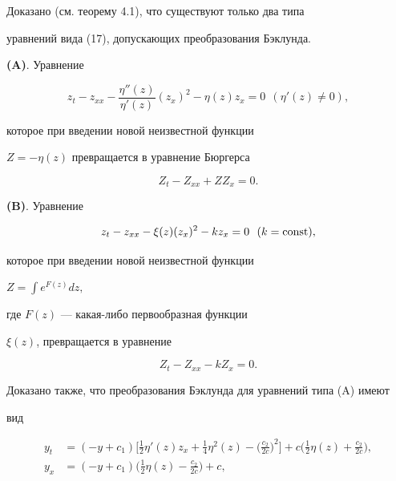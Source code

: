 Доказано (см. теорему 4.1), что существуют только два типа


уравнений вида (17), допускающих преобразования Бэклунда.


\medskip





{\bf (A)}. Уравнение


$$


z_t-z_{xx}-\frac{{\eta'' (z)}}{{\eta'


(z)}} ({z_x})^2-\eta (z) z_x


=0\ \  ({\eta' (z) \ne 0}),


$$


которое при введении новой неизвестной функции


$Z=- \eta (z)$ превращается в уравнение Бюргерса


\begin{equation}


Z_t-Z_{xx}+Z Z_x=0.


\end{equation}





{\bf (B)}. Уравнение 


$$


z_t-z_{xx}-\xi (z) 


({z_x})^2-k z_x=0 \ \ ({k=\const}),


$$


которое при введении новой неизвестной функции


$Z=\displaystyle \int {e^{F (z)} dz,}$


где $F (z)$ --- какая-либо первообразная функции


$\xi (z)$, превращается в уравнение


\begin{equation}


Z_t-Z_{xx}-k Z_x=0.


\end{equation}





Доказано также, что преобразования Бэклунда для уравнений типа (A) имеют 


вид


\begin{equation}


\begin{split}


y_t&=({-y+c_1}) \bigg[ {\frac{1}{2}\eta' (z)


z_x+\frac{1}{4}\eta^2 (z) -


\bigg({\frac{{c_2}}{{2c}}}\bigg)^2} \bigg]+


c \bigg({\frac{1}{2}\eta (z)+\frac{{c_2}}{{2c}}}\bigg), \\


%


y_x&=({-y+c_1}) \bigg(


{\frac{1}{2}\eta (z)-\frac{{c_2}}{{2c}}}\bigg)+c, 


\end{split}   


\end{equation}


